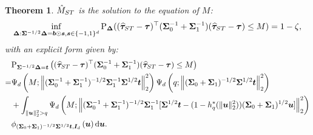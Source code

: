 \documentclass[10pt,a4paper]{amsart}
\newtheorem{theorem}{Theorem}
\def\P{{\mathrm P}}
\def\d{{\mathrm d}}
\newcommand{\htau}{\widehat\tau}
\begin{document}
\begin{theorem}\label{prop:CI_multi_ST}
  $\hat{M}_{\rm ST}$ is the solution to the equation of $M$:
  \begin{align*}
    \inf_{\bm{\Delta}: \bm{\Sigma}^{-1/2} \bm{\Delta} = \bm{b} \odot \bm{s}, \bm{s} \in \{-1,1\}^d} \P_{\bm{\Delta}}((\bm{\htau}_{\rm ST} - \bm{\tau})^\top (\bm{\Sigma}_0^{-1} + \bm{\Sigma}_1^{-1}) (\bm{\htau}_{\rm ST} - \bm{\tau}) \le M) = 1-\zeta,
  \end{align*} 
  with an explicit form given by:
  \begin{align}\label{eq:P_multi_ST}
    &\P_{\bm{\Sigma}^{-1/2}\bm{\Delta} = \bm{t}}\left((\bm{\htau}_{\rm ST}-\bm{\tau})^\top (\bm{\Sigma}_0^{-1} + \bm{\Sigma}_1^{-1})(\bm{\htau}_{\rm ST}-\bm{\tau})\le M\right) \nonumber\\
    =& \Psi_d\left(M;\left\lVert (\bm{\Sigma}_0^{-1} + \bm{\Sigma}_1^{-1})^{-1/2} \bm{\Sigma}_1^{-1} \bm{\Sigma}^{1/2} \bm{t}\right\rVert_2^2\right) \Psi_d\left(q; \left\lVert (\bm{\Sigma}_0 + \bm{\Sigma}_1)^{-1/2} \bm{\Sigma}^{1/2} \bm{t}\right\rVert_2^2\right) \nonumber\\
    &+ \int_{\lVert \bm{u} \rVert_2^2 > q} \Psi_d\left(M;\left\lVert (\bm{\Sigma}_0^{-1} + \bm{\Sigma}_1^{-1})^{-1/2} \bm{\Sigma}_1^{-1} [\bm{\Sigma}^{1/2} \bm{t} - (1-h_q^*(\lVert \bm{u} \rVert_2^2))(\bm{\Sigma}_0+ \bm{\Sigma}_1)^{1/2} \bm{u}]\right\rVert_2^2\right) \nonumber\\
    &\phi_{(\bm{\Sigma}_0 + \bm{\Sigma}_1)^{-1/2} \bm{\Sigma}^{1/2} \bm{t}, \bm{I}_d}\left(\bm{u}\right) \d \bm{u}.
  \end{align}
\end{theorem}
\end{document}
